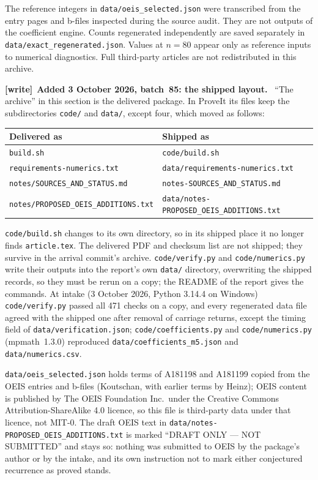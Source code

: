 \documentclass[11pt,letterpaper]{article}
\numberwithin{equation}{section}
\theoremstyle{definition}
\newcommand{\1}{\mathbf 1}
\newenvironment{writenote}[1][]{\par\smallskip\begingroup\small
 \noindent\textbf{[write]}\if\relax\detokenize{#1}\relax\else~\textbf{#1.}\fi\ }%
 {\par\endgroup\smallskip}
\begin{document}
The reference integers in \texttt{data/oeis\_selected.json} were transcribed
from the entry pages and b-files inspected during the source audit. They
are not outputs of the coefficient engine. Counts regenerated independently
are saved separately in \texttt{data/exact\_regenerated.json}. Values at
$n=80$ appear only as reference inputs to numerical diagnostics. Full
third-party articles are not redistributed in this archive.

\begin{writenote}[Added 3 October 2026, batch~85: the shipped layout]
``The archive'' in this section is the delivered package. In ProveIt its
files keep the subdirectories \texttt{code/} and \texttt{data/}, except
four, which moved as follows:
\begin{center}\footnotesize
\begin{tabular}{@{}ll@{}}
\toprule
Delivered as & Shipped as\\
\midrule
\texttt{build.sh} & \texttt{code/build.sh}\\
\texttt{requirements-numerics.txt} & \texttt{data/requirements-numerics.txt}\\
\texttt{notes/SOURCES\_AND\_STATUS.md} & \texttt{notes-SOURCES\_AND\_STATUS.md}\\
\texttt{notes/PROPOSED\_OEIS\_ADDITIONS.txt} & \texttt{data/notes-PROPOSED\_OEIS\_ADDITIONS.txt}\\
\bottomrule
\end{tabular}
\end{center}
\texttt{code/build.sh} changes to its own directory, so in its shipped
place it no longer finds \texttt{article.tex}. The delivered PDF and
checksum list are not shipped; they survive in the arrival commit's
archive. \texttt{code/verify.py} and
\texttt{code/numerics.py} write their outputs into the report's own
\texttt{data/} directory, overwriting the shipped records, so they must be
rerun on a copy; the README of the report gives the commands. At intake
(3 October 2026, Python 3.14.4 on Windows) \texttt{code/verify.py} passed
all 471 checks on a copy, and every regenerated data file agreed with the
shipped one after removal of carriage returns, except the timing field
of \texttt{data/\allowbreak verification.json}; \texttt{code/coefficients.py}
and \texttt{code/numerics.py} (mpmath~1.3.0) reproduced
\texttt{data/\allowbreak coefficients\_m5.json} and \texttt{data/\allowbreak numerics.csv}.

\texttt{data/\allowbreak oeis\_selected.json} holds terms of A181198 and
A181199 copied from the OEIS entries and b-files (Koutschan, with earlier
terms by Heinz); OEIS content is published by The OEIS Foundation Inc.\
under the Creative Commons Attribution-ShareAlike 4.0 licence, so this file
is third-party data under that licence, not MIT-0. The draft OEIS text in
\texttt{data/\allowbreak notes-\allowbreak PROPOSED\_\allowbreak OEIS\_\allowbreak ADDITIONS.txt} is
marked ``DRAFT ONLY --- NOT SUBMITTED'' and stays so: nothing was submitted
to OEIS by the package's author or by the intake, and its own instruction
not to mark either conjectured recurrence as proved stands.
\end{writenote}
\end{document}
